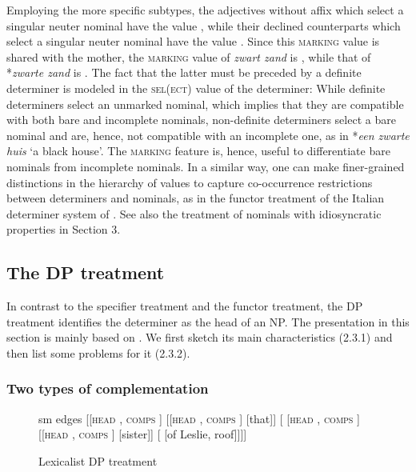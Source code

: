 \documentclass[output=paper
                ,modfonts
                ,nonflat
	        ,collection
	        ,collectionchapter
	        ,collectiontoclongg
 	        ,biblatex
                ,babelshorthands
                ,newtxmath
                ,draftmode
                ,colorlinks, citecolor=brown
]{./langsci/langscibook}
\begin{document}
Employing the more specific subtypes, the adjectives without affix which select a singular 
neuter nominal have the value , while their declined counterparts which select 
a singular neuter nominal have the value . 
Since this \textsc{marking} value is shared with the mother, the \textsc{marking} value 
of \emph{zwart zand} is , while that of *\emph{zwarte zand} is . 
The fact that the latter must be preceded by a definite determiner
is modeled in the \textsc{sel(ect)} value of the determiner: 
While definite determiners select an unmarked nominal, which implies that 
they are compatible with both bare and incomplete nominals,
non-definite determiners select a bare nominal and are, hence, not compatible 
with an incomplete one, as in *\emph{een zwarte huis} `a black house'. 
The \textsc{marking} feature is, hence, useful to differentiate bare 
nominals from incomplete nominals.  
In a similar way, one can make finer-grained distinctions in the hierarchy of  
 values to capture co-occurrence restrictions between determiners and 
nominals, as in the functor treatment of the Italian determiner system of 
\citet{Allegranza06}. See also the treatment of nominals with idiosyncratic properties 
in Section 3. 


\subsection{The DP treatment} 


In contrast to the specifier treatment and the functor treatment, the DP 
treatment identifies the determiner as the head of an NP. The presentation in this section   
is mainly based on \citet{Netter94}. We first sketch its main characteristics (2.3.1)
and then list some problems for it (2.3.2). 


\subsubsection{Two types of complementation} 


\begin{figure}
	\centering
	\begin{forest}
sm edges
[{[\textsc{head}  , \textsc{comps} \eliste]}
	[{[\textsc{head} , \textsc{comps} ]} [that]]
	[{ [\textsc{head}  , \textsc{comps} \eliste]}
		[{[\textsc{head} , \textsc{comps} ]} [sister]]
		[ [of Leslie, roof]]]]
	\end{forest}
	\caption{\label{net} Lexicalist DP treatment }
\end{figure}
\end{document}
